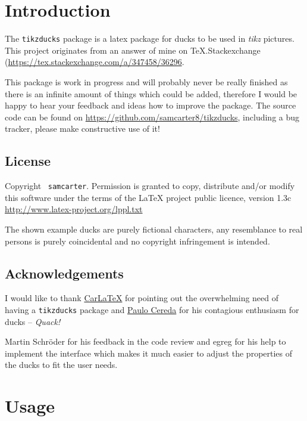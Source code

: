 \documentclass{ltxdockit}
\newcommand{\tikzducks}{\texttt{tikzducks}\xspace}
\begin{document}
\printtitlepage

\section{Introduction}
\label{intro}

The \tikzducks package is a latex package for ducks to be used in \emph{tikz} pictures. This project originates from an answer of mine on TeX.Stackexchange (\url{https://tex.stackexchange.com/a/347458/36296}.

This package is work in progress and will probably never be really finished as there is an infinite amount of things which could be added, therefore I would be happy to hear your feedback and ideas how to improve the package. The source code can be found on \url{https://github.com/samcarter8/tikzducks}, including a bug tracker, please make constructive use of it!

\subsection{License}

Copyright \textcopyright\ \texttt{samcarter}. Permission is granted to copy, distribute and\slash or modify this software under the terms of the LaTeX project public licence, version 1.3c \url{http://www.latex-project.org/lppl.txt}

The shown example ducks are purely fictional characters, any resemblance to real persons is purely coincidental and no copyright infringement is intended.

\subsection{Acknowledgements}

I would like to thank \href{https://tex.stackexchange.com/users/101651/carlatex}{CarLaTeX} for pointing out the overwhelming need of having a \tikzducks package and \href{https://tex.stackexchange.com/users/3094/paulo-cereda}{Paulo Cereda} for his contagious enthusiasm for ducks -- \emph{Quack!}

Martin Schr\"oder for his feedback in the code review and egreg for his help to implement the \texttt{\tikzset{}} interface which makes it much easier to adjust the properties of the ducks to fit the user needs.

\section{Usage}
\end{document}
